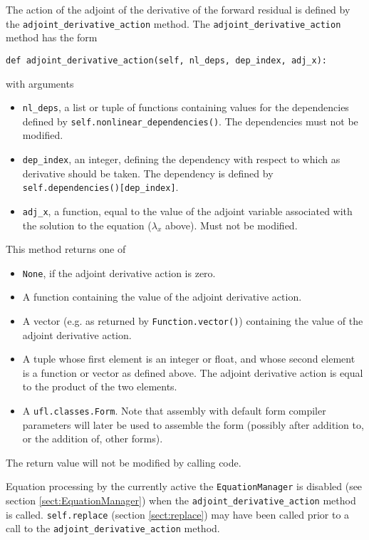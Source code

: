 \documentclass[11pt]{article}
\begin{document}
The action of the adjoint of the derivative of the forward residual is defined
by the \texttt{adjoint\_derivative\_action} method. The
\texttt{adjoint\_derivative\_action} method has the form
\begin{lstlisting}
def adjoint_derivative_action(self, nl_deps, dep_index, adj_x):
\end{lstlisting}
with arguments
\begin{itemize}
  \item \texttt{nl\_deps}, a list or tuple of functions containing values for
    the dependencies defined by \texttt{self.nonlinear\_dependencies()}. The
    dependencies must not be modified.
  \item \texttt{dep\_index}, an integer, defining the dependency with respect
    to which as derivative should be taken. The dependency is defined by
    \texttt{self.dependencies()[dep\_index]}.
  \item \texttt{adj\_x}, a function, equal to the value of the adjoint variable
    associated with the solution to the equation ($\lambda_x$ above). Must not
    be modified.
\end{itemize}
This method returns one of
\begin{itemize}
  \item \texttt{None}, if the adjoint derivative action is zero.
  \item A function containing the value of the adjoint derivative action.
  \item A vector (e.g. as returned by \texttt{Function.vector()}) containing
    the value of the adjoint derivative action.
  \item A tuple whose first element is an integer or float, and whose second
    element is a function or vector as defined above. The adjoint derivative
    action is equal to the product of the two elements.
  \item A \texttt{ufl.classes.Form}. Note that assembly with default form
    compiler parameters will later be used to assemble the form (possibly after
    addition to, or the addition of, other forms).
\end{itemize}
The return value will not be modified by calling code.

Equation processing by the currently active the \texttt{EquationManager} is
disabled (see section \ref{sect:EquationManager}) when the
\texttt{adjoint\_derivative\_action} method is called. \texttt{self.replace}
(section \ref{sect:replace}) may have been called prior to a call to the
\texttt{adjoint\_derivative\_action} method.
\end{document}
